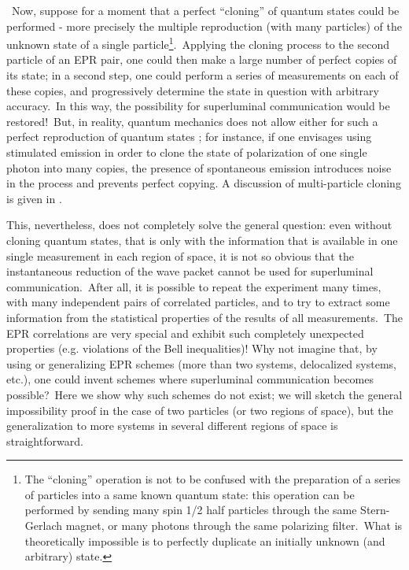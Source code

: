 \documentclass[12pt,onecolumn]{article}%
\begin{document}
\ Now, suppose for a moment that a perfect ``cloning'' of quantum states could
be performed - more precisely the multiple reproduction (with many particles)
of the unknown state of a single particle\footnote{The ``cloning'' operation
is not to be confused with the preparation of a series of particles into a
same known quantum state: this operation can be performed by sending many spin
1/2 half particles through the same Stern-Gerlach magnet, or many photons
through the same polarizing filter.\ What is theoretically impossible is to
perfectly duplicate an initially unknown (and arbitrary) state.}.\ Applying
the cloning process to the second particle of an EPR pair, one could then make
a large number of perfect copies of its state; in a second step, one could
perform a series of measurements on each of these copies, and progressively
determine the state in question with arbitrary accuracy.\ In this way, the
possibility for superluminal communication would be restored!\ But, in
reality, quantum mechanics does not allow either for such a perfect
reproduction of quantum states \cite{Wooters-Zurek} \cite{Dieks}; for
instance, if one envisages using stimulated emission in order to clone the
state of polarization of one single photon into many copies, the presence of
spontaneous emission introduces noise in the process and prevents perfect
copying. A discussion of multi-particle cloning is given in
\cite{Gisin-Massar}.

This, nevertheless, does not completely solve the general question: even
without cloning quantum states, that is only with the information that is
available in one single measurement in each region of space, it is not so
obvious that the instantaneous reduction of the wave packet cannot be used for
superluminal communication.\ After all, it is possible to repeat the
experiment many times, with many independent pairs of correlated particles,
and to try to extract some information from the statistical properties of the
results of all measurements.\ The EPR correlations are very special and
exhibit such completely unexpected properties (e.g. violations of the Bell
inequalities)! Why not imagine that, by using or generalizing EPR schemes
(more than two systems, delocalized systems, etc.), one could invent schemes
where superluminal communication becomes possible?\ Here we show why such
schemes do not exist; we will sketch the general impossibility proof in the
case of two particles (or two regions of space), but the generalization to
more systems in several different regions of space is straightforward.
\end{document}
